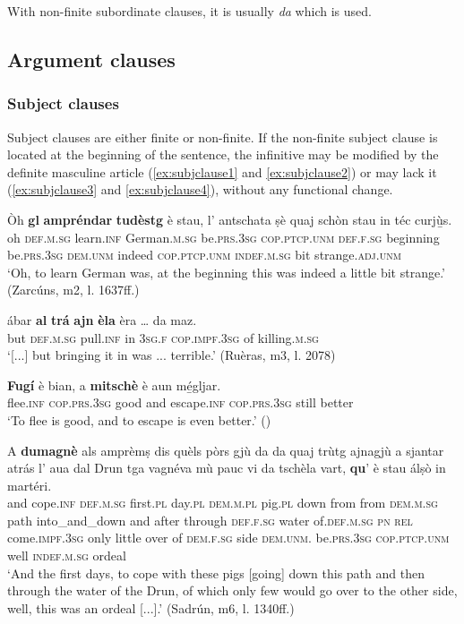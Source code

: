With non-finite subordinate clauses, it is usually \textit{da} which is used.

\subsection{Argument clauses}

\subsubsection{Subject clauses}
Subject clauses are either finite or non-finite. If the non-finite subject clause is located at the beginning of the sentence, the infinitive may be modified by the definite masculine article (\ref{ex:subjclause1} and \ref{ex:subjclause2}) or may lack it (\ref{ex:subjclause3} and \ref{ex:subjclause4}), without any functional change.

\ea
\label{ex:subjclause1}
	\gll    Òh \textbf{gl} \textbf{ampréndar} \textbf{tudèstg} è stau, l’ antschata ṣè quaj schòn stau in téc curjù̱s.\\
oh \textsc{def.m.sg} learn.\textsc{inf} German.\textsc{m.sg} be.\textsc{prs.3sg}  \textsc{cop.ptcp.unm} \textsc{def.f.sg} beginning be.\textsc{prs.3sg} \textsc{dem.unm} indeed \textsc{cop.ptcp.unm} \textsc{indef.m.sg} bit strange.\textsc{adj.unm}\\
\glt `Oh, to learn German was, at the beginning this was indeed a little bit strange.' (Zarcúns, m2, l. 1637ff.)
\z

\ea
\label{ex:subjclause2}
\gll [...] ábar \textbf{al} \textbf{trá} \textbf{ajn} \textbf{èla} èra … da maz.   \\
{} but \textsc{def.m.sg} pull.\textsc{inf} in \textsc{3sg.f} \textsc{cop.impf.3sg} {} of killing.\textsc{m.sg}\\
\glt `[...] but bringing it in was ... terrible.' (Ruèras, m3, l. 2078)
\z

\ea
\label{ex:subjclause3}
\gll \textbf{Fugí} è bian, a \textbf{mitschè} è aun mé̱gljar. \\
   flee.\textsc{inf} \textsc{cop.prs.3sg} good and escape.\textsc{inf} \textsc{cop.prs.3sg} still better  \\
\glt `To flee is good, and to escape is even better.' ()
\z

\ea
\label{ex:subjclause4}
\gll    A \textbf{dumagnè} als amprèmṣ dis quèls pòrs gjù da da quaj trùtg ajnagjù a sjantar atrás l’ aua dal Drun tga vagnéva mù pauc vi da tschèla vart, \textbf{qu}’ è stau álṣò in martéri.\\
and cope.\textsc{inf} \textsc{def.m.sg} first.\textsc{pl}  day.\textsc{pl} \textsc{dem.m.pl}  pig.\textsc{pl} down from from \textsc{dem.m.sg} path into\_and\_down and after through \textsc{def.f.sg} water of.\textsc{def.m.sg}  \textsc{pn} \textsc{rel} come.\textsc{impf.3sg} only little over of \textsc{dem.f.sg} side \textsc{dem.unm.} be.\textsc{prs.3sg} \textsc{cop.ptcp.unm} well \textsc{indef.m.sg} ordeal \\
\glt `And the first days, to cope with these pigs [going] down this path and then through the water of the Drun, of which only few would go over to the other side, well, this was an ordeal [...].' (Sadrún, m6, l. 1340ff.)
\z

